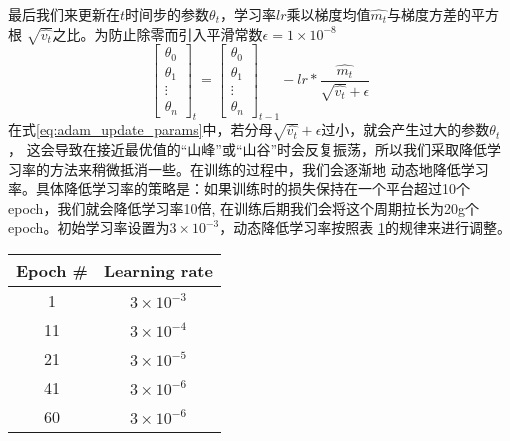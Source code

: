 \noindent{}最后我们来更新在$t$时间步的参数$\theta_{t}$，学习率$lr$乘以梯度均值$\widehat{m_t}$与梯度方差的平方根
$\sqrt{\widehat{v_t}}$之比。为防止除零而引入平滑常数$\epsilon = 1 \times {10}^{-8}$
\begin{equation}\label{eq:adam_update_params}
    \begin{bmatrix}
        \theta_{0} \\
        \theta_{1} \\
        \vdots \\
        \theta_{n}
    \end{bmatrix}_{t} = 
    \begin{bmatrix}
        \theta_{0} \\
        \theta_{1} \\
        \vdots \\
        \theta_{n}
    \end{bmatrix}_{t-1} -
    {lr} * \frac{\widehat{m_t}}{\sqrt{\widehat{v_t}} + \epsilon}
\end{equation}
在式\ref{eq:adam_update_params}中，若分母$\sqrt{\widehat{v_t}}+\epsilon$过小，就会产生过大的参数$\theta_{t}$，
这会导致在接近最优值的“山峰”或“山谷”时会反复振荡，所以我们采取降低学习率的方法来稍微抵消一些。在训练的过程中，我们会逐渐地
动态地降低学习率。具体降低学习率的策略是：如果训练时的损失保持在一个平台超过10个epoch，我们就会降低学习率10倍, 
在训练后期我们会将这个周期拉长为20g个epoch。初始学习率设置为$3 \times {10}^{-3}$，动态降低学习率按照表
\ref{tbl:descend_lr}的规律来进行调整。
\begin{table}[!htp]
    \label{tbl:descend_lr}
    \centering
    \begin{tabular}{cc}
        \toprule
        Epoch \# & Learning rate \\
        \midrule
        1 & $3 \times {10}^{-3}$ \\
        11 & $3 \times {10}^{-4}$ \\
        21 & $3 \times {10}^{-5}$ \\
        41 & $3 \times {10}^{-6}$ \\
        60 & $3 \times {10}^{-6}$ \\
        \bottomrule
    \end{tabular}
\end{table}


